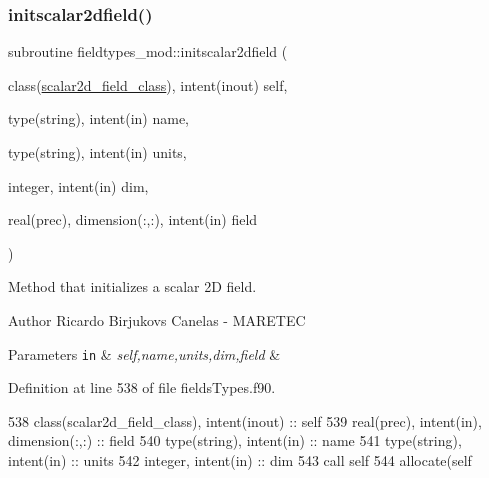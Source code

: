 \subsubsection{\texorpdfstring{initscalar2dfield()}{initscalar2dfield()}}
{\footnotesize\ttfamily subroutine fieldtypes\+\_\+mod\+::initscalar2dfield (\begin{DoxyParamCaption}\item[{class(\mbox{\hyperlink{structfieldtypes__mod_1_1scalar2d__field__class}{scalar2d\+\_\+field\+\_\+class}}), intent(inout)}]{self,  }\item[{type(string), intent(in)}]{name,  }\item[{type(string), intent(in)}]{units,  }\item[{integer, intent(in)}]{dim,  }\item[{real(prec), dimension(\+:,\+:), intent(in)}]{field }\end{DoxyParamCaption})\hspace{0.3cm}{\ttfamily [private]}}



Method that initializes a scalar 2D field. 

\begin{DoxyAuthor}{Author}
Ricardo Birjukovs Canelas -\/ M\+A\+R\+E\+T\+EC 
\end{DoxyAuthor}

\begin{DoxyParams}[1]{Parameters}
\mbox{\tt in}  & {\em self,name,units,dim,field} & \\
\hline
\end{DoxyParams}


Definition at line 538 of file fields\+Types.\+f90.


\begin{DoxyCode}
538     \textcolor{keywordtype}{class}(scalar2d\_field\_class), \textcolor{keywordtype}{intent(inout)} :: self
539     \textcolor{keywordtype}{real(prec)}, \textcolor{keywordtype}{intent(in)}, \textcolor{keywordtype}{dimension(:,:)} :: field
540     \textcolor{keywordtype}{type}(string), \textcolor{keywordtype}{intent(in)} :: name
541     \textcolor{keywordtype}{type}(string), \textcolor{keywordtype}{intent(in)} :: units
542     \textcolor{keywordtype}{integer}, \textcolor{keywordtype}{intent(in)} :: dim
543     \textcolor{keyword}{call }self%
544     \textcolor{keyword}{allocate}(self%
\end{DoxyCode}
\mbox{\label{namespacefieldtypes__mod_a3f2b90bc391ea5b84ead8069ee90f515}} 
